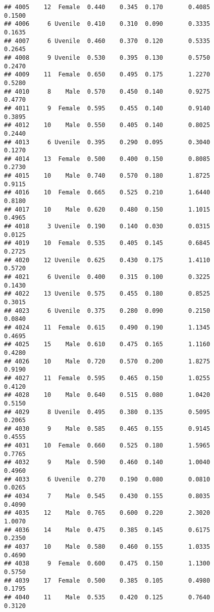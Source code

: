\documentclass[
]{article}
\begin{document}
\begin{verbatim}
## 4005    12  Female  0.440    0.345  0.170       0.4085         0.1500
## 4006     6 Uvenile  0.410    0.310  0.090       0.3335         0.1635
## 4007     6 Uvenile  0.460    0.370  0.120       0.5335         0.2645
## 4008     9 Uvenile  0.530    0.395  0.130       0.5750         0.2470
## 4009    11  Female  0.650    0.495  0.175       1.2270         0.5280
## 4010     8    Male  0.570    0.450  0.140       0.9275         0.4770
## 4011     9  Female  0.595    0.455  0.140       0.9140         0.3895
## 4012    10    Male  0.550    0.405  0.140       0.8025         0.2440
## 4013     6 Uvenile  0.395    0.290  0.095       0.3040         0.1270
## 4014    13  Female  0.500    0.400  0.150       0.8085         0.2730
## 4015    10    Male  0.740    0.570  0.180       1.8725         0.9115
## 4016    10  Female  0.665    0.525  0.210       1.6440         0.8180
## 4017    10    Male  0.620    0.480  0.150       1.1015         0.4965
## 4018     3 Uvenile  0.190    0.140  0.030       0.0315         0.0125
## 4019    10  Female  0.535    0.405  0.145       0.6845         0.2725
## 4020    12 Uvenile  0.625    0.430  0.175       1.4110         0.5720
## 4021     6 Uvenile  0.400    0.315  0.100       0.3225         0.1430
## 4022    13 Uvenile  0.575    0.455  0.180       0.8525         0.3015
## 4023     6 Uvenile  0.375    0.280  0.090       0.2150         0.0840
## 4024    11  Female  0.615    0.490  0.190       1.1345         0.4695
## 4025    15    Male  0.610    0.475  0.165       1.1160         0.4280
## 4026    10    Male  0.720    0.570  0.200       1.8275         0.9190
## 4027    11  Female  0.595    0.465  0.150       1.0255         0.4120
## 4028    10    Male  0.640    0.515  0.080       1.0420         0.5150
## 4029     8 Uvenile  0.495    0.380  0.135       0.5095         0.2065
## 4030     9    Male  0.585    0.465  0.155       0.9145         0.4555
## 4031    10  Female  0.660    0.525  0.180       1.5965         0.7765
## 4032     9    Male  0.590    0.460  0.140       1.0040         0.4960
## 4033     6 Uvenile  0.270    0.190  0.080       0.0810         0.0265
## 4034     7    Male  0.545    0.430  0.155       0.8035         0.4090
## 4035    12    Male  0.765    0.600  0.220       2.3020         1.0070
## 4036    14    Male  0.475    0.385  0.145       0.6175         0.2350
## 4037    10    Male  0.580    0.460  0.155       1.0335         0.4690
## 4038     9  Female  0.600    0.475  0.150       1.1300         0.5750
## 4039    17  Female  0.500    0.385  0.105       0.4980         0.1795
## 4040    11    Male  0.535    0.420  0.125       0.7640         0.3120

\end{verbatim}
\end{document}
